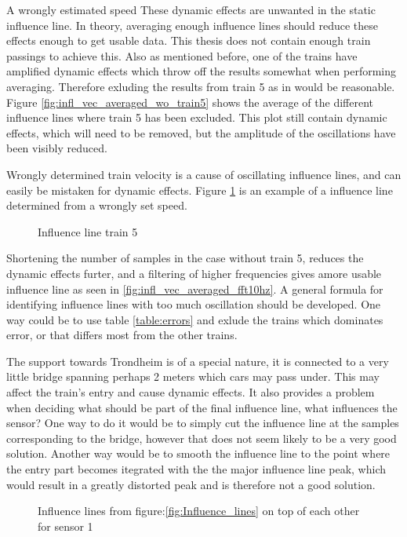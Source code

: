A wrongly estimated speed
These dynamic effects are unwanted in the static influence line. In theory, averaging enough influence lines should reduce these effects enough to get usable data. This thesis does not contain enough train passings to achieve this. Also as mentioned before, one of the trains have amplified dynamic effects which throw off the results somewhat when performing averaging. Therefore exluding the results from train 5 as in would be reasonable. Figure \ref{fig:infl_vec_averaged_wo_train5} shows the average of the different influence lines where train 5 has been excluded. This plot still contain dynamic effects, which will need to be removed, but the amplitude of the oscillations have been visibly reduced.

Wrongly determined train velocity is a cause of oscillating influence lines, and can easily be mistaken for dynamic effects. Figure \ref{fig:train5_wrongSpeed} is an example of a influence line determined from a wrongly set speed.
\begin{figure}[H]
	\begin{adjustbox}{center}
		
	\end{adjustbox}
	\caption{Influence line train 5}
	\label{fig:train5_wrongSpeed}
\end{figure}

Shortening the number of samples in the case without train 5, reduces the dynamic effects furter, and a filtering of higher frequencies gives amore usable influence line as seen in \ref{fig:infl_vec_averaged_fft10hz}.
A general formula for identifying influence lines with too much oscillation should be developed. One way could be to use table \ref{table:errors} and exlude the trains which dominates error, or that differs most from the other trains.

The support towards Trondheim is of a special nature, it is connected to a very little bridge spanning perhaps 2 meters which cars may pass under. This may affect the train's entry and cause dynamic effects. It also provides a problem when deciding what should be part of the final influence line, what influences the sensor?
One way to do it would be to simply cut the influence line at the samples corresponding to the bridge, however that does not seem likely to be a very good solution. Another way would be to smooth the influence line to the point where the entry part becomes itegrated with the the major influence line peak, which would result in a greatly distorted peak and is therefore not a good solution.
\begin{figure}[H]
	\begin{adjustbox}{center}
		
	\end{adjustbox}
	\caption{Influence lines from figure:\ref{fig:Influence_lines} on top of each other for sensor 1}
	\label{fig:infl_all_trains}
\end{figure}


